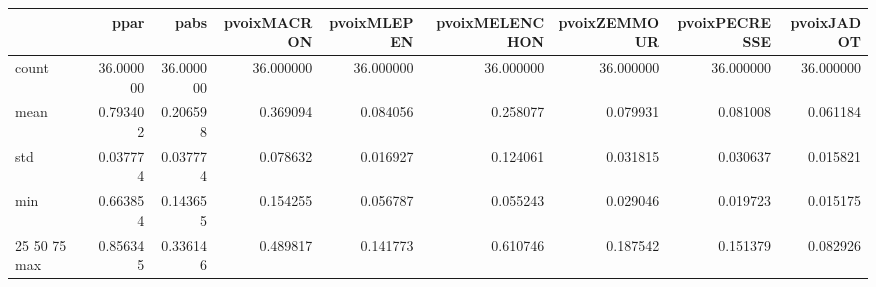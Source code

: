 \begin{tabular}{lrrrrrrrr}
\toprule
 & ppar & pabs & pvoixMACRON & pvoixMLEPEN & pvoixMELENCHON & pvoixZEMMOUR & pvoixPECRESSE & pvoixJADOT \\
\midrule
count & 36.000000 & 36.000000 & 36.000000 & 36.000000 & 36.000000 & 36.000000 & 36.000000 & 36.000000 \\
mean & 0.793402 & 0.206598 & 0.369094 & 0.084056 & 0.258077 & 0.079931 & 0.081008 & 0.061184 \\
std & 0.037774 & 0.037774 & 0.078632 & 0.016927 & 0.124061 & 0.031815 & 0.030637 & 0.015821 \\
min & 0.663854 & 0.143655 & 0.154255 & 0.056787 & 0.055243 & 0.029046 & 0.019723 & 0.015175 \\
25%
50%
75%
max & 0.856345 & 0.336146 & 0.489817 & 0.141773 & 0.610746 & 0.187542 & 0.151379 & 0.082926 \\
\bottomrule
\end{tabular}
